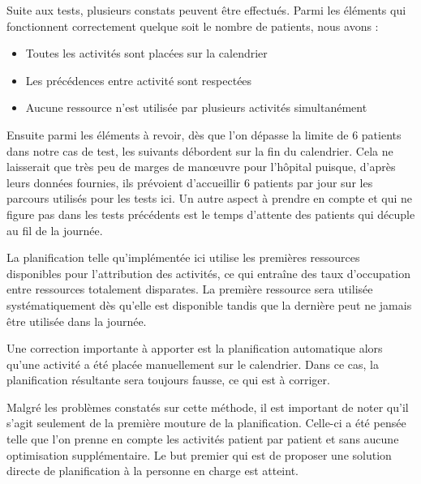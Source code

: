 \documentclass{polytech/polytech}
\begin{document}
Suite aux tests, plusieurs constats peuvent être effectués. Parmi les éléments qui fonctionnent correctement quelque soit le nombre de patients, nous avons : 

\begin{itemize}
	\item Toutes les activités sont placées sur la calendrier
	\item Les précédences entre activité sont respectées
	\item Aucune ressource n'est utilisée par plusieurs activités simultanément
\end{itemize}

Ensuite parmi les éléments à revoir, dès que l'on dépasse la limite de 6 patients dans notre cas de test, les suivants débordent sur la fin du calendrier. Cela ne laisserait que très peu de marges de manœuvre pour l'hôpital puisque, d'après leurs données fournies, ils prévoient d'accueillir 6 patients par jour sur les parcours utilisés pour les tests ici. Un autre aspect à prendre en compte et qui ne figure pas dans les tests précédents est le temps d'attente des patients qui décuple au fil de la journée.

La planification telle qu'implémentée ici utilise les premières ressources disponibles pour l'attribution des activités, ce qui entraîne des taux d'occupation entre ressources totalement disparates. La première ressource sera utilisée systématiquement dès qu'elle est disponible tandis que la dernière peut ne jamais être utilisée dans la journée. 

Une correction importante à apporter est la planification automatique alors qu'une activité a été placée manuellement sur le calendrier. Dans ce cas, la planification résultante sera toujours fausse, ce qui est à corriger.

Malgré les problèmes constatés sur cette méthode, il est important de noter qu'il s'agit seulement de la première mouture de la planification. Celle-ci a été pensée telle que l'on prenne en compte les activités patient par patient et sans aucune optimisation supplémentaire. Le but premier qui est de proposer une solution directe de planification à la personne en charge est atteint.
\end{document}
